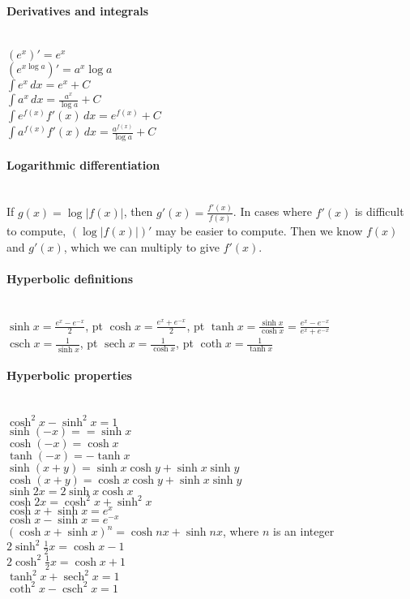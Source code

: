 \documentclass[10pt]{article}
\DeclareMathOperator{\csch}{csch}
\DeclareMathOperator{\sech}{sech}
\begin{document}
\paragraph{Derivatives and integrals}\ \\
$(e^x)' = e^x$\\
$(e^{x \log a})' = a^x \log a$\\
$\int e^x\,dx = e^x + C$\\
$\int a^x\,dx = \frac{a^x}{\log a} + C$\\
$\int e^{f(x)}f'(x)\,dx = e^{f(x)} + C$\\
$\int a^{f(x)}f'(x)\,dx = \frac{a^{f(x)}}{\log a} + C$

\paragraph{Logarithmic differentiation}\ \\
If $g(x) = \log |f(x)|$, then $g'(x) = \frac{f'(x)}{f(x)}$.
In cases where $f'(x)$ is difficult to compute, $(\log |f(x)|)'$ may be easier to compute.
Then we know $f(x)$ and $g'(x)$, which we can multiply to give $f'(x)$.

\paragraph{Hyperbolic definitions}\ \\
$\sinh x = \frac{e^x - e^{-x}}{2}$,  pt
$\cosh x = \frac{e^x + e^{-x}}{2}$,  pt
$\tanh x = \frac{\sinh x}{\cosh x} = \frac{e^x - e^{-x}}{e^x + e^{-x}}$\\
$\csch x = \frac{1}{\sinh x}$,  pt
$\sech x = \frac{1}{\cosh x}$,  pt
$\coth x = \frac{1}{\tanh x}$

\paragraph{Hyperbolic properties}\ \\
$\cosh^2 x - \sinh^2 x = 1$\\
$\sinh(-x) = =\sinh x$\\
$\cosh(-x) = \cosh x$\\
$\tanh(-x) = -\tanh x$\\
$\sinh(x+y)=\sinh x \cosh y + \sinh x \sinh y$\\
$\cosh(x+y)=\cosh x \cosh y + \sinh x \sinh y$\\
$\sinh 2x = 2 \sinh x \cosh x$\\
$\cosh 2x = \cosh^2 x + \sinh^2 x$\\
$\cosh x + \sinh x=e^x$\\
$\cosh x - \sinh x = e^{-x}$\\
$(\cosh x + \sinh x)^n = \cosh nx + \sinh nx$, where $n$ is an integer\\
$2 \sinh^2 \frac{1}{2} x = \cosh x -1$\\
$2 \cosh^2 \frac{1}{2} x = \cosh x + 1$\\
$\tanh^2 x + \sech^2 x = 1$\\
$\coth^2 x - \csch^2 x = 1$
\end{document}
